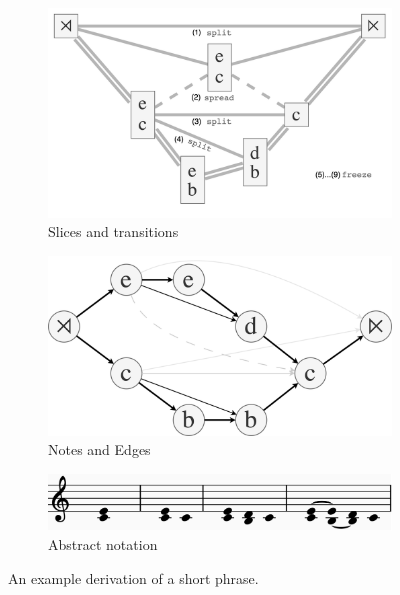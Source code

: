 \documentclass[12pt,a4paper,twoside,openany]{report} \usepackage[pdfborder={0 0 0}]{hyperref}    %
\theoremstyle{definition} \newtheorem{definition}{Definition}[section]
\begin{document}
\begin{figure}[ht] \centering \begin{subfigure}[t]{.5\textwidth}
  \centering\includegraphics[keepaspectratio,width=\textwidth]{prep/cadenceouterder.png} \caption{Slices and
  transitions} \label{fig:cadenceOuterDer} \end{subfigure} \begin{subfigure}[t]{.42\textwidth}
  \centering\includegraphics[keepaspectratio,width=\textwidth]{prep/cadenceinnerder.png} \caption{Notes and Edges}
  \label{fig:cadenceInnerDer} \end{subfigure} \begin{subfigure}[t]{.8\textwidth}
\centering\includegraphics[keepaspectratio,width=\textwidth]{prep/cadencederivation.png} \caption{Abstract notation}
\label{fig:cadenceDerivation} \end{subfigure}
\captionsetup{width=.9\linewidth} 
\caption{An example derivation of a short phrase.
} \label{fig:innerOuterStructure} 
\end{figure}
\end{document}

